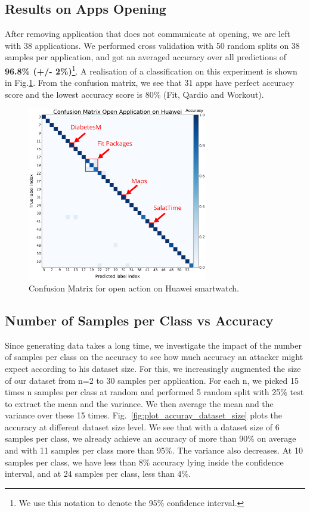 \newpage

\subsection{Results on Apps Opening} After removing application that does not communicate at opening, we are left with 38 applications. We performed cross validation with 50 random splits on 38 samples per application, and got an averaged accuracy over all predictions of \textbf{96.8\% (+/- 2\%)}\footnote{We use this notation to denote the 95\% confidence interval.}. A realisation of a classification on this experiment is shown in Fig.\ref{fig:cm_open_huawei}. From the confusion matrix, we see that 31 apps have perfect accuracy score and the lowest accuracy score is 80\% (Fit, Qardio and Workout). 

\begin{figure}[H]
 \centering
 \includegraphics[width=0.70\textwidth]{figures/cm/Confusion_matrix_for_huawei_annoted.png}
 \caption{Confusion Matrix for open action on Huawei smartwatch.}
  \label{fig:cm_open_huawei}
\end{figure}


\newpage


\subsection{Number of Samples \label{data_set_size_per_class}
per Class vs Accuracy} Since generating data takes a long time, we investigate the impact of the number of samples per class on the accuracy to see how much accuracy an attacker might expect according to his dataset size. For this, we increasingly augmented the size of our dataset from n=2 to 30 samples per application. For each n, we picked 15 times n samples per class at random and performed 5 random split with 25\% test to extract the mean and the variance. We then average the mean and the variance over these 15 times. Fig.~\ref{fig:plot_accuray_dataset_size} plots the accuracy at different dataset size level.  We see that with a dataset size of 6 samples per class, we already achieve an accuracy of more than 90\% on average and with 11 samples per class more than 95\%. The variance also decreases. At 10 samples per class, we have less than 8\% accuracy lying inside the confidence interval, and at 24 samples per class, less than 4\%. 

